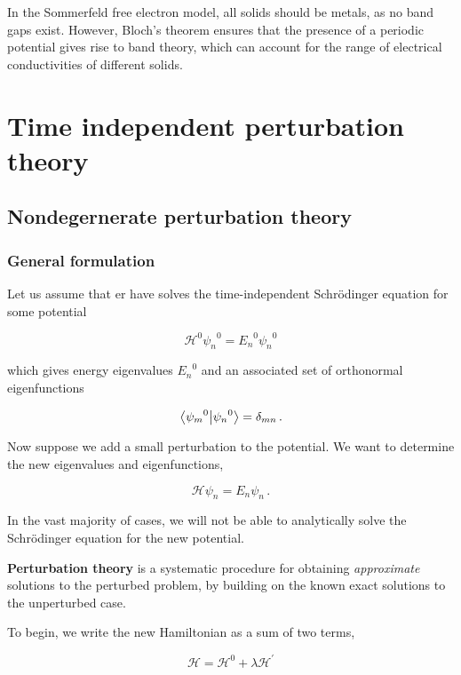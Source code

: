 \documentclass[12pt, titlepage]{article}
\begin{document}
In the Sommerfeld free electron model, all solids should be metals, as no band gaps exist. However, Bloch's theorem ensures that the presence of a periodic potential gives rise to band theory, which can account for the range of electrical conductivities of different solids.

\section{Time independent perturbation theory}
\subsection{Nondegernerate perturbation theory}
\subsubsection{General formulation}
Let us assume that er have solves the time-independent Schrödinger equation for some potential

\begin{equation}
	\mathcal{H}^0{\psi_n}^0 = {E_n}^0{\psi_n}^0
\end{equation}

which gives energy eigenvalues ${E_n}^0$ and an associated set of orthonormal eigenfunctions

\begin{equation}
	\bra{{\psi_m}^0}\ket{{\psi_n}^0} = \delta_{mn} \,.
\end{equation}

Now suppose we add a small perturbation to the potential. We want to determine the new eigenvalues and eigenfunctions,

\begin{equation}
\mathcal{H}\psi_n = E_n\psi_n \,.
\end{equation}

In the vast majority of cases, we will not be able to analytically solve the Schrödinger equation for the new potential.

\textbf{Perturbation theory} is a systematic procedure for obtaining \emph{approximate} solutions to the perturbed problem, by building on the known exact solutions to the unperturbed case. 

To begin, we write the new Hamiltonian as a sum of two terms,

\begin{equation}
	\mathcal{H} = \mathcal{H}^0 + \lambda\mathcal{H}^{\prime}
\end{equation}
\end{document}

